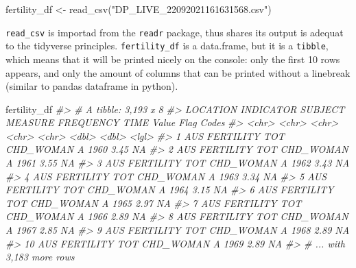 \documentclass[
]{article}
\newenvironment{Shaded}{\begin{snugshade}}{\end{snugshade}}
\newcommand{\CommentTok}[1]{\textcolor[rgb]{0.56,0.35,0.01}{\textit{#1}}}
\newcommand{\FunctionTok}[1]{\textcolor[rgb]{0.00,0.00,0.00}{#1}}
\newcommand{\NormalTok}[1]{#1}
\newcommand{\OtherTok}[1]{\textcolor[rgb]{0.56,0.35,0.01}{#1}}
\newcommand{\StringTok}[1]{\textcolor[rgb]{0.31,0.60,0.02}{#1}}
\begin{document}
\begin{Shaded}
\begin{Highlighting}[]
\NormalTok{fertility\_df }\OtherTok{\textless{}{-}} \FunctionTok{read\_csv}\NormalTok{(}\StringTok{"DP\_LIVE\_22092021161631568.csv"}\NormalTok{)}
\end{Highlighting}
\end{Shaded}

\texttt{read\_csv} is importad from the \texttt{readr} package, thus shares its output is adequat to the tidyverse principles. \texttt{fertility\_df} is a data.frame, but it is a \texttt{tibble}, which means that it will be printed nicely on the console: only the first 10 rows appears, and only the amount of columns that can be printed without a linebreak (similar to pandas dataframe in python).

\begin{Shaded}
\begin{Highlighting}[]
\NormalTok{fertility\_df}
\CommentTok{\#\textgreater{} \# A tibble: 3,193 x 8}
\CommentTok{\#\textgreater{}    LOCATION INDICATOR SUBJECT MEASURE   FREQUENCY  TIME Value \textasciigrave{}Flag Codes\textasciigrave{}}
\CommentTok{\#\textgreater{}    \textless{}chr\textgreater{}    \textless{}chr\textgreater{}     \textless{}chr\textgreater{}   \textless{}chr\textgreater{}     \textless{}chr\textgreater{}     \textless{}dbl\textgreater{} \textless{}dbl\textgreater{} \textless{}lgl\textgreater{}       }
\CommentTok{\#\textgreater{}  1 AUS      FERTILITY TOT     CHD\_WOMAN A          1960  3.45 NA          }
\CommentTok{\#\textgreater{}  2 AUS      FERTILITY TOT     CHD\_WOMAN A          1961  3.55 NA          }
\CommentTok{\#\textgreater{}  3 AUS      FERTILITY TOT     CHD\_WOMAN A          1962  3.43 NA          }
\CommentTok{\#\textgreater{}  4 AUS      FERTILITY TOT     CHD\_WOMAN A          1963  3.34 NA          }
\CommentTok{\#\textgreater{}  5 AUS      FERTILITY TOT     CHD\_WOMAN A          1964  3.15 NA          }
\CommentTok{\#\textgreater{}  6 AUS      FERTILITY TOT     CHD\_WOMAN A          1965  2.97 NA          }
\CommentTok{\#\textgreater{}  7 AUS      FERTILITY TOT     CHD\_WOMAN A          1966  2.89 NA          }
\CommentTok{\#\textgreater{}  8 AUS      FERTILITY TOT     CHD\_WOMAN A          1967  2.85 NA          }
\CommentTok{\#\textgreater{}  9 AUS      FERTILITY TOT     CHD\_WOMAN A          1968  2.89 NA          }
\CommentTok{\#\textgreater{} 10 AUS      FERTILITY TOT     CHD\_WOMAN A          1969  2.89 NA          }
\CommentTok{\#\textgreater{} \# ... with 3,183 more rows}
\end{Highlighting}
\end{Shaded}
\end{document}
